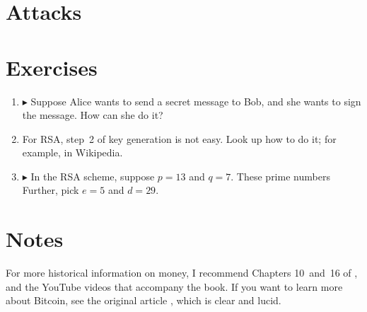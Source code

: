 \section{Attacks}\label{sec:bitcoin-attacks}

\section{Exercises}

\begin{enumerate}
\item
  $\blacktriangleright$
  Suppose Alice wants to send a secret message to Bob, and she wants to sign the message.
  How can she do it?

\item
  For RSA, step~2 of key generation is not easy.
  Look up how to do it; for example, in Wikipedia.

\item
  $\blacktriangleright$
  In the RSA scheme, suppose $p=13$ and $q=7$.
  These prime numbers 
  Further, pick $e=5$ and $d=29$.

\end{enumerate}

\section{Notes}

For more historical information on money, I recommend Chapters 10~and~16 of \citet{sapiens}, and the YouTube videos that accompany the book.
If you want to learn more about Bitcoin, see the original article \citep{bitcoin}, which is clear and lucid.





